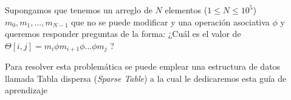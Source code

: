 Supongamos que tenemos un arreglo de $N$ elementos ($1 \le N \le 10^5$) $m_0, m_1, \dots ,m_{N-1}$ que no se puede modificar y una operación asociativa $\phi$ y queremos responder preguntas  de la forma: ¿Cuál es el valor de $\Theta [i, j] = m_i \phi m_{i+1} \phi \dots \phi m_{j}$ ?

Para resolver esta problemática se puede emplear una estructura de datos llamada Tabla dispersa (\emph{Sparse Table}) a la cual le dedicaremos esta guía de aprendizaje
